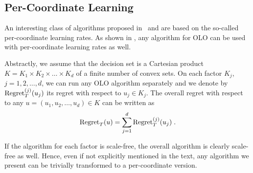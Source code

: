 \subsection{Per-Coordinate Learning}

An interesting class of algorithms proposed in~\cite{McMahan-Streeter-2010} and
\cite{Duchi-Hazan-Singer-2011} are based on the so-called per-coordinate
learning rates.  As shown in \cite{Streeter-McMahan-2010}, any algorithm for
OLO can be used with per-coordinate learning rates as well.

Abstractly, we assume that the decision set is a Cartesian product $K=K_1
\times K_2 \times \dots \times K_d$ of a finite number of convex sets.  On each
factor $K_j$, $j=1,2,\dots,d$, we can run any OLO algorithm separately and we
denote by $\operatorname{Regret}_T^{(j)}(u_j)$ its regret with respect to $u_j \in K_j$. The
overall regret with respect to any $u=(u_1, u_2, \dots, u_d) \in K$ can be
written as
$$
\operatorname{Regret}_T(u) = \sum_{j=1}^d \operatorname{Regret}_T^{(j)}(u_j) \; .
$$

If the algorithm for each factor is scale-free, the overall algorithm is
clearly scale-free as well. Hence, even if not explicitly mentioned in the
text, any algorithm we present can be trivially transformed to a per-coordinate
version.
